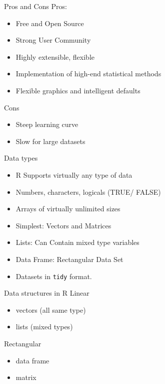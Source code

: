 \documentclass[compress,xcolor=table]{beamer}
\newcommand{\pp}{\pause}
\begin{document}
\begin{frame}{Pros and Cons}
	Pros:
	\begin{itemize}
		\item 	Free and Open Source
		\item Strong User Community
		\item Highly extensible, flexible
		\item Implementation of high-end statistical methods
		\item Flexible graphics and intelligent defaults
	\end{itemize}\pp 
	
	Cons
	\begin{itemize}
		\item Steep learning curve
		\item Slow for large datasets
	\end{itemize}
	
\end{frame}




\begin{frame}{Data types}
	\begin{itemize}
		\item R Supports virtually any type of data
		\item 	Numbers, characters, logicals (TRUE/ FALSE)
		\item 	Arrays of virtually unlimited sizes
		\item 	Simplest: Vectors and Matrices
		\item 	Lists: Can Contain mixed type variables
		\item 	Data Frame: Rectangular Data Set
		\item  Datasets in {\tt tidy} format.
		
	\end{itemize}
\end{frame}




\begin{frame}{Data structures in R}
	Linear
	\begin{itemize}
		\item vectors (all same type)
		\item lists (mixed types)
	\end{itemize}\pp 
	Rectangular
	\begin{itemize}
		\item data frame
		\item matrix
	\end{itemize}
	
\end{frame}
\end{document}
